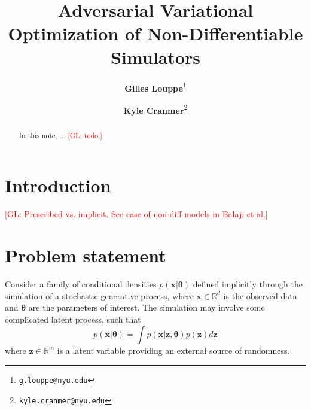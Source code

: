 \documentclass[twocolumn,superscriptaddress,aps]{revtex4-1}
\newcommand{\glnote}[1]{\textcolor{red}{[GL: #1]}}
\theoremstyle{plain}
\begin{document}

\title{\Large{Adversarial Variational Optimization of Non-Differentiable Simulators}}
\vspace{1cm}
\author{\small{\bf Gilles Louppe}\thanks{\texttt{g.louppe@nyu.edu}}}
\author{\small{\bf Kyle Cranmer}\thanks{\texttt{kyle.cranmer@nyu.edu}}}

\begin{abstract}

In this note, ... \glnote{todo.}


\end{abstract}

\maketitle


\section{Introduction}

\glnote{Prescribed vs. implicit. See case of non-diff models in Balaji et al.}



\section{Problem statement}

Consider a family of conditional densities $p(\mathbf{x}|\mathbf{\theta})$
defined implicitly through the simulation of a stochastic generative
process, where $\mathbf{x} \in \mathbb{R}^d$ is the observed data and
$\mathbf{\theta}$ are the parameters of interest. The simulation may involve
some complicated latent process, such that
\begin{equation}\label{eqn:p_x}
    p(\mathbf{x}|\mathbf{\theta}) = \int p(\mathbf{x}|\mathbf{z},\mathbf{\theta}) p(\mathbf{z}) d\mathbf{z}
\end{equation}
where $\mathbf{z} \in \mathbb{R}^m$ is a latent variable providing an external source
of randomness.
\end{document}
